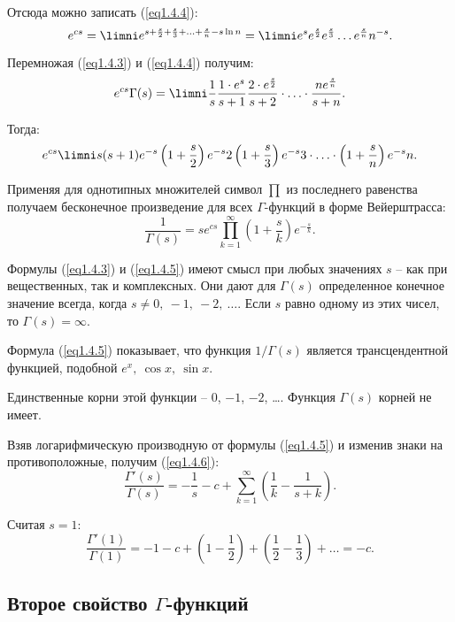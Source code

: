 Отсюда можно записать (\ref{eq1.4.4}):
\begin{equation}
    e^{cs} = \limni e^{s + \frac{s}{2} + \frac{s}{3} + \ldots + \frac{s}{n} -
    s\ln{n}} = \limni e^s e^\frac{s}{2} e^\frac{s}{3}\ldots e^\frac{s}{n}n^{-s}.
    \label{eq1.4.4}
\end{equation}

Перемножая (\ref{eq1.4.3}) и (\ref{eq1.4.4}) получим:
\[
    e^{cs}\Gamma(s) = \limni \frac{1}{s}\frac{1\cdot e^s}{s+1}
    \frac{2\cdot e^\frac{s}{2}}{s+2}\cdot\ldots\cdot\frac{ne^\frac{s}{n}}{s+n}.
\]

Тогда:
\[
    e^{cs}\limni s(s+1)e^{-s} \left(1+\frac{s}{2}\right)e^{-s}{2}
    \left(1+\frac{s}{3}\right)e^{-s}{3}\cdot\ldots\cdot
    \left(1+\frac{s}{n}\right)e^{-s}{n}.
\]

Применяя для однотипных множителей символ \( \prod \) из последнего равенства
получаем бесконечное произведение для всех \( \Gamma \)-функций в форме
Вейерштрасса:
\begin{equation}
    \frac{1}{\Gamma(s)} =
    se^{cs}\prod\limits_{k=1}^\infty\left(1+\frac{s}{k}\right)e^{-\frac{s}{k}}.
    \label{eq1.4.5}
\end{equation}

Формулы (\ref{eq1.4.3}) и (\ref{eq1.4.5}) имеют смысл при любых значениях
\( s \) -- как при вещественных, так и комплексных. Они дают для \( \Gamma(s) \)
определенное конечное значение всегда, когда \( s \ne 0,\ -1,\ -2,\ \ldots \).
Если \( s \) равно одному из этих чисел, то \( \Gamma(s) = \infty \).

Формула (\ref{eq1.4.5}) показывает, что функция \( 1/\Gamma(s) \) является
трансцендентной функцией, подобной \( e^x,\ \cos x,\ \sin x \).

Единственные корни этой функции -- \( 0 \), \( -1 \), \( -2 \), \ldots. Функция
\( \Gamma(s) \) корней не имеет.

Взяв логарифмическую производную от формулы (\ref{eq1.4.5}) и изменив знаки на
противоположные, получим (\ref{eq1.4.6}):
\begin{equation}
   \frac{\Gamma'(s)}{\Gamma(s)} = -\frac{1}{s} - c + \sum\limits_{k=1}^\infty
   \left(\frac{1}{k} - \frac{1}{s+k}\right).
   \label{eq1.4.6}
\end{equation}

Считая \( s = 1\):
\[
    \frac{\Gamma'(1)}{\Gamma(1)} = -1 - c + \left(1 - \frac{1}{2}\right) +
    \left(\frac{1}{2} - \frac{1}{3}\right) + \ldots = -c.
\]

\subsection{Второе свойство \( \Gamma \)-функций}\

